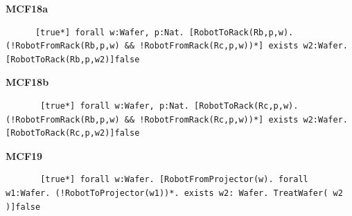 \documentclass[12pt]{report}
\begin{document}
    \textbf{MCF18a}
    \begin{lstlisting}
      [true*] forall w:Wafer, p:Nat. [RobotToRack(Rb,p,w).(!RobotFromRack(Rb,p,w) && !RobotFromRack(Rc,p,w))*] exists w2:Wafer. [RobotToRack(Rb,p,w2)]false
    \end{lstlisting}
    
    \textbf{MCF18b}
    \begin{lstlisting}
       [true*] forall w:Wafer, p:Nat. [RobotToRack(Rc,p,w).(!RobotFromRack(Rb,p,w) && !RobotFromRack(Rc,p,w))*] exists w2:Wafer.[RobotToRack(Rc,p,w2)]false
    \end{lstlisting}

    \textbf{MCF19}
    \begin{lstlisting}
       [true*] forall w:Wafer. [RobotFromProjector(w). forall w1:Wafer. (!RobotToProjector(w1))*. exists w2: Wafer. TreatWafer( w2 )]false
       \end{lstlisting}
\end{document}
